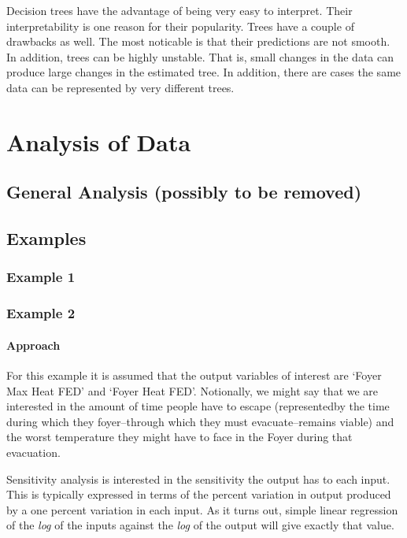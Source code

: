 \documentclass[12pt,twoside]{book}
\begin{document}
Decision trees have the advantage of being very easy to interpret. Their interpretability is one reason for their popularity. Trees have a couple of drawbacks as well. The most noticable is that their predictions are not smooth. In addition, trees can be highly unstable. That is, small changes in the data can produce large changes in the estimated tree. In addition, there are cases the same data can be represented by very different trees.


%
%

\chapter{Analysis of Data}

\section{General Analysis (possibly to be removed)}

\section{Examples}

\subsection{Example 1}

\subsection{Example 2}
\hypertarget{approach}{%
\subsubsection{Approach}\label{approach}}

For this example it is assumed that the output variables of interest are `Foyer Max Heat FED' and `Foyer Heat FED'. Notionally, we might say that we are interested in the amount of time people have to escape (representedby the time during which they foyer--through which they must evacuate--remains viable) and the worst temperature they might have to face in the Foyer during that evacuation.

Sensitivity analysis is interested in the sensitivity the output has to each input. This is typically expressed in terms of the percent variation in output produced by a one percent variation in each input. As it turns out, simple linear regression of the \emph{log} of the
inputs against the \emph{log} of the output will give exactly that value.
\end{document}
